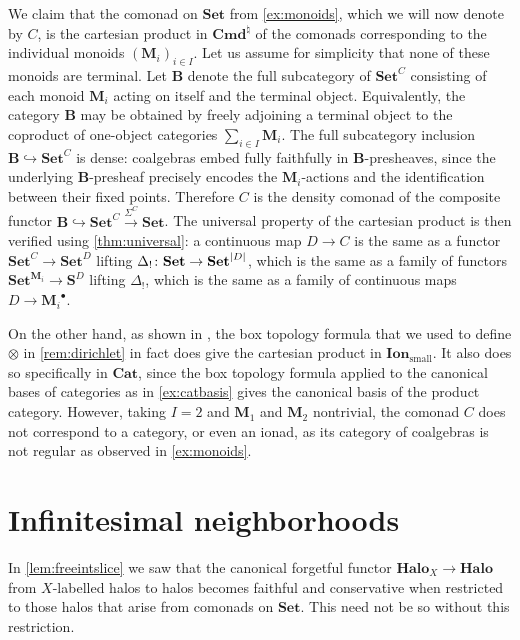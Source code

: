 \documentclass[11pt, oneside, article]{memoir}
\theoremstyle{plain}
\theoremstyle{definition}
\theoremstyle{remark}
\newenvironment{counterexample}
{\renewcommand\qedsymbol{$\lrcorner$}%
  \pushQED{\qed}\mycounterexample}
{\popQED\endmycounterexample}
\DeclarePairedDelimiter{\abs}{\lvert}{\rvert}
\newcommand{\xto}[1]{\xrightarrow{#1}}
\newcommand{\bang}{\mathrm{!}}
\newcommand{\namedcat}[1]{\mathbf{#1}}
\newcommand{\cat}[1]{\mathbf{#1}}
\newcommand{\Halo}{\namedcat{Halo}}
\newcommand{\LHalo}[1]{\Halo_{#1}}
\newcommand{\Set}{\namedcat{Set}}
\newcommand{\Cat}{\namedcat{Cat}}
\newcommand{\Con}{\namedcat{Cmd}^\natural}
\newcommand{\ConSet}{\Con}
\newcommand{\CoalgOn}[2]{{#2}^{#1}}
\newcommand{\CoalgSet}[1]{\CoalgOn{#1}{\Set}}
\newcommand{\CoalgS}[1]{\CoalgOn{#1}{\bS}}
\newcommand{\pts}[1]{{\abs{#1}}}
\newcommand{\carr}{\Sigma}
\newcommand{\reindex}[1]{\Delta_{#1}}
\newcommand{\car}[1]{\carr^{#1}}
\newcommand{\carC}{\car{\cC}}
\newcommand{\fun}[2]{{#2}^{#1}}
\newcommand{\Ionad}{\namedcat{Ion}}
\newcommand{\AccIonad}{\Ionad_{\mathrm{small}}}
\newcommand{\cmnd}[1]{{#1}}
\newcommand{\xX}{X}
\newcommand{\cC}{\cmnd{C}}
\newcommand{\cD}{\cmnd{D}}
\newcommand{\bB}{\cat{B}}
\newcommand{\bM}{\cat{M}}
\newcommand{\bS}{\cat{S}}
\newcommand{\CSet}{\CoalgSet{\cC}}
\newcommand{\DSet}{\CoalgSet{\cD}}
\newcommand{\DS}{\CoalgS{\cD}}
\newcommand{\SetpD}{\Set^\pts{\cD}}
\newcommand{\cattocmd}[1]{{{#1}^\bullet}}
\begin{document}
\begin{counterexample}[Non-product product]\label{cex:nonproductproduct}
  We claim that the comonad on $\Set$ from \cref{ex:monoids}, which
  we will now denote by $\cC$, is the cartesian product in $\ConSet$
  of the comonads corresponding to the individual monoids
  $(\bM_i)_{i \in I}$. Let us assume for simplicity that none of these
  monoids are terminal. Let $\bB$ denote the full subcategory of
  $\CSet$ consisting of each monoid $\bM_i$ acting on itself and the
  terminal object. Equivalently, the category $\bB$ may be obtained by
  freely adjoining a terminal object to the coproduct of one-object
  categories $\sum_{i \in I} \bM_i$. The full subcategory inclusion
  $\bB \hookrightarrow \CSet$ is dense: coalgebras embed fully
  faithfully in $\bB$-presheaves, since the underlying $\bB$-presheaf
  precisely encodes the $\bM_i$-actions and the identification between
  their fixed points. Therefore $\cC$ is the density comonad of the
  composite functor $\bB \hookrightarrow \CSet \xto{\carC} \Set$. The
  universal property of the cartesian product is then verified using
  \cref{thm:universal}: a continuous map $\cD \to \cC$ is the same as
  a functor $\CSet \to \DSet$ lifting
  $\reindex{\bang} \colon \Set \to \SetpD$, which is the same as a
  family of functors $\fun{\bM_i}{\Set} \to \DS$ lifting
  $\reindex{\bang}$, which is the same as a family of continuous maps
  $\cD \to \cattocmd{\bM_i}$.

  On the other hand, as shown in \cite[Remark 6.4]{garner:ionads}, the
  box topology formula that we used to define $\otimes$ in
  \cref{rem:dirichlet} in fact does give the cartesian product in
  $\AccIonad$. It also does so specifically in $\Cat$, since the box
  topology formula applied to the canonical bases of categories as in
  \cref{ex:catbasis} gives the canonical basis of the product
  category. However, taking $I = 2$ and $\bM_1$ and $\bM_2$ nontrivial,
  the comonad $\cC$ does not correspond to a category, or even an
  ionad, as its category of coalgebras is not regular as observed in
  \cref{ex:monoids}.
\end{counterexample}

\section*{Infinitesimal neighborhoods}

In \cref{lem:freeintslice} we saw that the canonical forgetful functor
$\LHalo{\xX} \to \Halo$ from $\xX$-labelled halos to halos becomes
faithful and conservative when restricted to those halos that arise
from comonads on $\Set$. This need not be so without this restriction.
\end{document}
